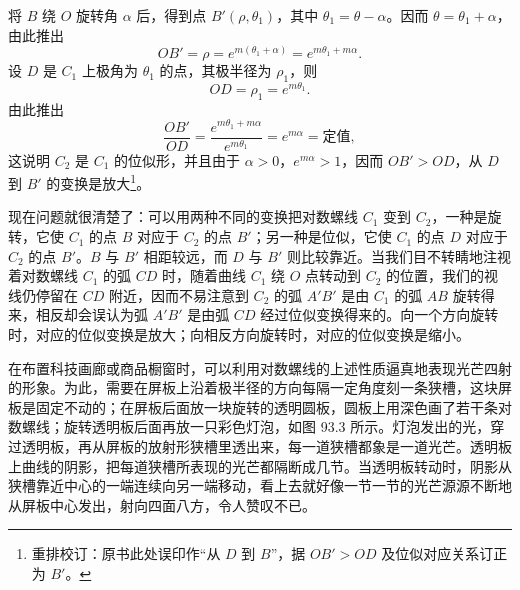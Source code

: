 将 $B$ 绕 $O$ 旋转角 $\alpha$ 后，得到点 $B'(\rho, \theta_1)$，其中 $\theta_1 = \theta - \alpha$。因而 $\theta = \theta_1 + \alpha$，由此推出
\[
  OB' = \rho = e^{m(\theta_1 + \alpha)} = e^{m\theta_1 + m\alpha}.
\]
设 $D$ 是 $C_1$ 上极角为 $\theta_1$ 的点，其极半径为 $\rho_1$，则
\[
  OD = \rho_1 = e^{m\theta_1}.
\]
由此推出
\[
  \frac{OB'}{OD} = \frac{e^{m\theta_1 + m\alpha}}{e^{m\theta_1}} = e^{m\alpha} = \text{定值},
\]
这说明 $C_2$ 是 $C_1$ 的位似形，并且由于 $\alpha > 0$，$e^{m\alpha} > 1$，因而 $OB' > OD$，从 $D$ 到 $B'$ 的变换是放大\footnote{重排校订：原书此处误印作“从 $D$ 到 $B$”，据 $OB' > OD$ 及位似对应关系订正为 $B'$。}。

现在问题就很清楚了：可以用两种不同的变换把对数螺线 $C_1$ 变到 $C_2$，一种是旋转，它使 $C_1$ 的点 $B$ 对应于 $C_2$ 的点 $B'$；另一种是位似，它使 $C_1$ 的点 $D$ 对应于 $C_2$ 的点 $B'$。$B$ 与 $B'$ 相距较远，而 $D$ 与 $B'$ 则比较靠近。当我们目不转睛地注视着对数螺线 $C_1$ 的弧 $CD$ 时，随着曲线 $C_1$ 绕 $O$ 点转动到 $C_2$ 的位置，我们的视线仍停留在 $CD$ 附近，因而不易注意到 $C_2$ 的弧 $A'B'$ 是由 $C_1$ 的弧 $AB$ 旋转得来，相反却会误认为弧 $A'B'$ 是由弧 $CD$ 经过位似变换得来的。向一个方向旋转时，对应的位似变换是放大；向相反方向旋转时，对应的位似变换是缩小。

在布置科技画廊或商品橱窗时，可以利用对数螺线的上述性质逼真地表现光芒四射的形象。为此，需要在屏板上沿着极半径的方向每隔一定角度刻一条狭槽，这块屏板是固定不动的；在屏板后面放一块旋转的透明圆板，圆板上用深色画了若干条对数螺线；旋转透明板后面再放一只彩色灯泡，如图 93.3 所示。灯泡发出的光，穿过透明板，再从屏板的放射形狭槽里透出来，每一道狭槽都象是一道光芒。透明板上曲线的阴影，把每道狭槽所表现的光芒都隔断成几节。当透明板转动时，阴影从狭槽靠近中心的一端连续向另一端移动，看上去就好像一节一节的光芒源源不断地从屏板中心发出，射向四面八方，令人赞叹不已。

